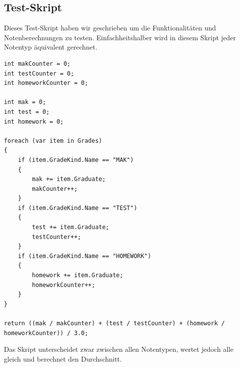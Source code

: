 \newpage
\subsection*{Test-Skript}
Dieses Test-Skript haben wir geschrieben um die Funktionalitäten und Notenberechnungen zu testen.
Einfachheitshalber wird in diesem Skript jeder Notentyp äquivalent gerechnet.

\begin{lstlisting}[language={[Sharp]C},caption=Test for CsharpScripting,label=lst:impl:csc]
    int makCounter = 0;
int testCounter = 0;
int homeworkCounter = 0;

int mak = 0;
int test = 0;
int homework = 0;

foreach (var item in Grades)
{
    if (item.GradeKind.Name == "MAK")
    {
        mak += item.Graduate;
        makCounter++;
    }
    if (item.GradeKind.Name == "TEST")
    {
        test += item.Graduate;
        testCounter++;
    }
    if (item.GradeKind.Name == "HOMEWORK")
    {
        homework += item.Graduate;
        homeworkCounter++;
    }
}

return ((mak / makCounter) + (test / testCounter) + (homework / homeworkCounter)) / 3.0;
\end{lstlisting}

Das Skript unterscheidet zwar zwischen allen Notentypen, wertet jedoch alle gleich 
und berechnet den Durchschnitt.
